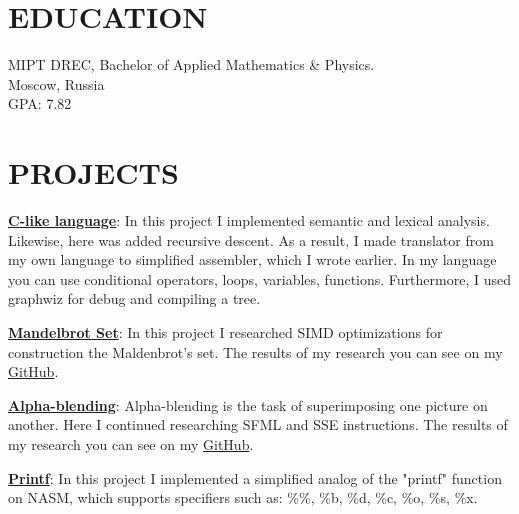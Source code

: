 \documentclass[margin]{res}
\begin{document}
\begin{resume}

\section{EDUCATION}
MIPT DREC, Bachelor of Applied Mathematics \& Physics. \\
Moscow, Russia\\
GPA: 7.82

\section{PROJECTS}
\par
\textbf{\href{https://github.com/KirillLakhnov/Language}{C-like language}}: 
In this project I implemented semantic and lexical analysis. Likewise, here was added recursive descent. As a result, I made translator from my own language to simplified assembler, which I wrote earlier. In my language you can use conditional operators, loops, variables, functions. Furthermore, I used graphwiz for debug and compiling a tree.

\par
\textbf{\href{https://github.com/KirillLakhnov/Mandelbrot}{Mandelbrot Set}}:
In this project I researched SIMD optimizations for construction the Maldenbrot's set. The results of my research you can see on my \href{https://github.com/KirillLakhnov/Mandelbrot}{GitHub}.

\par
\textbf{\href{https://github.com/KirillLakhnov/Alpha-blending}{Alpha-blending}}: 
Alpha-blending is the task of superimposing one picture on another. Here I continued researching SFML and SSE instructions. The results of my research you can see on my \href{https://github.com/KirillLakhnov/Alpha-blending}{GitHub}.

\par
\textbf{\href{https://github.com/KirillLakhnov/ASM_PRINTF}{Printf}}: 
In this project I implemented a simplified analog of the "printf" function on NASM, which supports specifiers such as: \%\%, \%b, \%d, \%c, \%o, \%s, \%x.



\end{resume}
\end{document}
